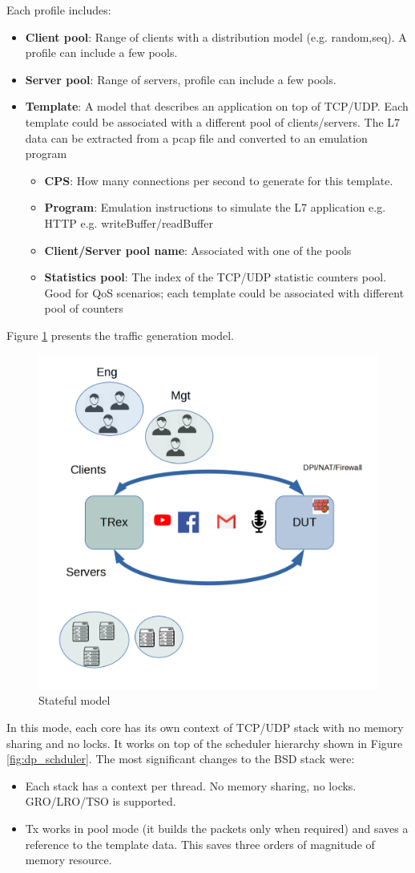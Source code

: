 \documentclass[letterpaper]{article}
\begin{document}
Each profile includes:
\begin{itemize}
\item \textbf{Client pool}: Range of clients with a distribution model (e.g. random,seq). A profile can include a few pools.
\item \textbf{Server pool}: Range of servers, profile can include a few pools. 
\item \textbf{Template}: A model that describes an application on top of TCP/UDP. Each template could be associated with a different pool of clients/servers. The L7 data can be extracted from a pcap file and converted to an emulation program
\begin{itemize}
\item \textbf{CPS}: How many connections per second to generate for this template. 
\item \textbf{Program}: Emulation instructions to simulate the L7 application e.g. HTTP e.g. writeBuffer/readBuffer
\item \textbf{Client/Server pool name}: Associated with one of the pools
\item \textbf{Statistics pool}: The index of the TCP/UDP statistic counters pool. Good for QoS scenarios; each template could be associated with different pool of counters 
\end{itemize}
\end{itemize}

Figure \ref{fig:astf} presents the traffic generation model. 

\begin{figure}[h]
\includegraphics[width=0.3
\textwidth, center]{stateful_model.png}
\caption{Stateful model}
\label{fig:astf}
\end{figure}

In this mode, each core has its own context of TCP/UDP stack with no memory sharing and no locks. It works on top of the scheduler hierarchy shown in Figure \ref{fig:dp_schduler}.
The most significant changes to the BSD stack were:
\begin{itemize}
\item Each stack has a context per thread. No memory sharing, no locks. GRO/LRO/TSO is supported. 
\item Tx works in pool mode (it builds the packets only when required) and saves a reference to the template data. This saves three orders of magnitude of memory resource.
\end{itemize}
\end{document}
